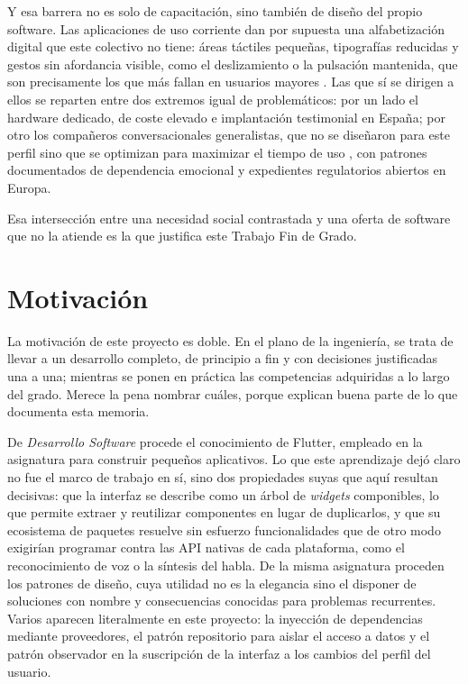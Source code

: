 Y esa barrera no es solo de capacitación, sino también de diseño del propio software. Las aplicaciones de uso
corriente dan por supuesta una alfabetización digital que este colectivo no tiene: áreas táctiles pequeñas,
tipografías reducidas y gestos sin afordancia visible, como el deslizamiento o la pulsación mantenida, que son
precisamente los que más fallan en usuarios mayores \citep{Kane2019}. Las que sí se dirigen a ellos se
reparten entre dos extremos igual de problemáticos: por un lado el hardware dedicado, de coste elevado e
implantación testimonial en España; por otro los compañeros conversacionales generalistas, que no se diseñaron
para este perfil sino que se optimizan para maximizar el tiempo de uso \citep{Zhou2020}, con patrones
documentados de dependencia emocional y expedientes regulatorios abiertos en Europa.

Esa intersección entre una necesidad social contrastada y una oferta de software que no la atiende es la que
justifica este Trabajo Fin de Grado.

\section{Motivación}

La motivación de este proyecto es doble. En el plano de la ingeniería, se trata de llevar a un desarrollo
completo, de principio a fin y con decisiones justificadas una a una; mientras se ponen en práctica las competencias adquiridas a lo largo del grado. Merece la pena nombrar cuáles, porque explican buena parte de lo que documenta esta memoria.

De \textit{Desarrollo Software} procede el conocimiento de Flutter, empleado en la asignatura para construir pequeños aplicativos. Lo que este aprendizaje dejó claro no fue el marco de trabajo en sí, sino dos propiedades suyas que aquí resultan decisivas: que la interfaz se describe como un árbol de \emph{widgets} componibles,
lo que permite extraer y reutilizar componentes en lugar de duplicarlos, y que su ecosistema de paquetes resuelve sin esfuerzo funcionalidades que de otro modo exigirían programar contra las API nativas de cada plataforma, como
el reconocimiento de voz o la síntesis del habla. De la misma asignatura proceden los patrones de diseño, cuya
utilidad no es la elegancia sino el disponer de soluciones con nombre y consecuencias conocidas para problemas
recurrentes. Varios aparecen literalmente en este proyecto: la inyección de dependencias mediante proveedores,
el patrón repositorio para aislar el acceso a datos y el patrón observador en la suscripción de la interfaz a
los cambios del perfil del usuario.

